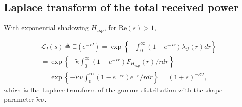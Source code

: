 \documentclass[lettersize,journal]{IEEEtran}
\begin{document}





\subsection{Laplace transform of the total received power}

With exponential shadowing ${H}_{\text{exp}}$, for Re$(s)>1$,

\begin{align}
  \label{eq:lapdef}
  &\mathcal{L}_{I}(s)\triangleq \mathbb{E}\left(e^{-sI}\right)= \exp\left\{-\int_0^{\infty}(1-e^{-sr}) \lambda_{\mathcal{G}}(r) dr \right\} \nonumber \\
  &=\exp\left\{-\tilde{\kappa}\int_0^{\infty}(1-e^{-sr}) F_{{H}_{\text{exp}}}(r) /r dr \right\} \nonumber \\
  &=\exp\left\{-\tilde{\kappa}\upsilon_{}\int_0^{\infty}(1-e^{-sr}) e^{-r} /r dr \right\} =(1+s)^{-\tilde{\kappa}\upsilon_{}},
\end{align}
which is the Laplace transform of the gamma distribution with the shape parameter $\tilde{\kappa}\upsilon_{}$. 
\end{document}

